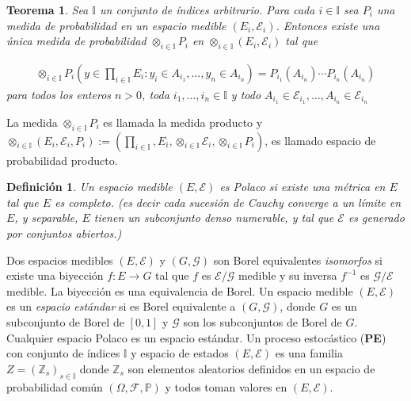 \documentclass{article}
\newtheorem{Def}{Definición}
\newtheorem{Teo}{Teorema}
\newcommand{\prob}{\mathbb{P}}
\begin{document}
\begin{Teo}
Sea $\mathbb{I}$ un conjunto de \'indices arbitrario. Para cada $i\in\mathbb{I}$ sea $P_{i}$ una medida de probabilidad en un espacio medible $\left(E_{i},\mathcal{E}_{i}\right)$. Entonces existe una \'unica medida de probabilidad $\otimes_{i\in\mathbb{I}}P_{i}$ en $\otimes_{i\in\mathbb{I}}\left(E_{i},\mathcal{E}_{i}\right)$ tal que 

\begin{eqnarray*}
\otimes_{i\in\mathbb{I}}P_{i}\left(y\in\prod_{i\in\mathbb{I}}E_{i}:y_{i}\in A_{i_{1}},\ldots,y_{n}\in A_{i_{n}}\right)=P_{i_{1}}\left(A_{i_{n}}\right)\cdots P_{i_{n}}\left(A_{i_{n}}\right)
\end{eqnarray*}
para todos los enteros $n>0$, toda $i_{1},\ldots,i_{n}\in\mathbb{I}$ y todo $A_{i_{1}}\in\mathcal{E}_{i_{1}},\ldots,A_{i_{n}}\in\mathcal{E}_{i_{n}}$
\end{Teo}

La medida $\otimes_{i\in\mathbb{I}}P_{i}$ es llamada la medida producto y $\otimes_{i\in\mathbb{I}}\left(E_{i},\mathcal{E}_{i},P_{i}\right):=\left(\prod_{i\in\mathbb{I}},E_{i},\otimes_{i\in\mathbb{I}}\mathcal{E}_{i},\otimes_{i\in\mathbb{I}}P_{i}\right)$, es llamado espacio de probabilidad producto.

\begin{Def}
Un espacio medible $\left(E,\mathcal{E}\right)$ es \textit{Polaco} si existe una m\'etrica en $E$ tal que $E$ es completo. (es decir cada sucesi\'on de Cauchy converge a un l\'imite en $E$, y \textit{separable}, $E$ tienen un subconjunto denso numerable, y tal que $\mathcal{E}$ es generado por conjuntos abiertos.)
\end{Def}

Dos espacios medibles $\left(E,\mathcal{E}\right)$ y $\left(G,\mathcal{G}\right)$ son Borel equivalentes \textit{isomorfos} si existe una biyecci\'on $f:E\rightarrow G$ tal que $f$ es $\mathcal{E}/\mathcal{G}$ medible y su inversa $f^{-1}$ es $\mathcal{G}/\mathcal{E}$ medible. La biyecci\'on es una equivalencia de Borel.  Un espacio medible  $\left(E,\mathcal{E}\right)$ es un \textit{espacio est\'andar} si es Borel equivalente a $\left(G,\mathcal{G}\right)$, donde $G$ es un subconjunto de Borel de $\left[0,1\right]$ y $\mathcal{G}$ son los subconjuntos de Borel de $G$. Cualquier espacio Polaco es un espacio est\'andar. Un proceso estoc\'astico (\textbf{PE}) con conjunto de \'indices $\mathbb{I}$ y espacio de estados $\left(E,\mathcal{E}\right)$ es una familia $Z=\left(\mathbb{Z}_{s}\right)_{s\in\mathbb{I}}$ donde $\mathbb{Z}_{s}$ son elementos aleatorios definidos en un espacio de probabilidad com\'un $\left(\Omega,\mathcal{F},\prob\right)$ y todos toman valores en $\left(E,\mathcal{E}\right)$.
\end{document}
